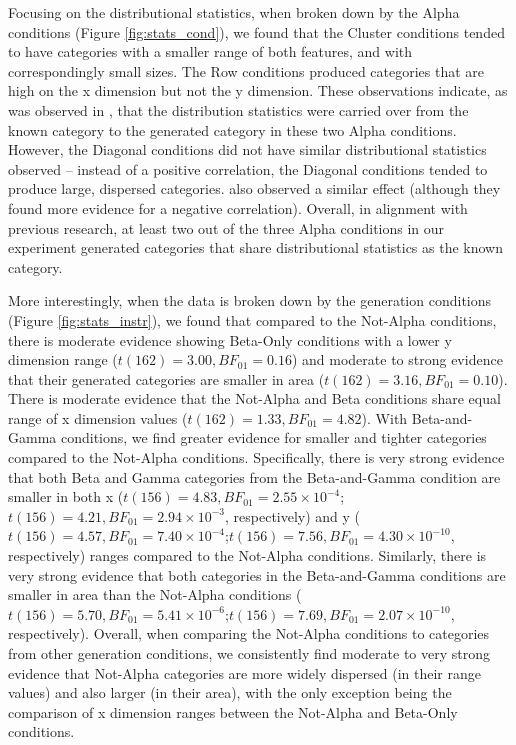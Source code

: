 \documentclass[10pt,letterpaper]{article}
\begin{document}
Focusing on the distributional statistics, when broken down by the Alpha conditions (Figure \ref{fig:stats_cond}), we found that the Cluster conditions tended to have categories with a smaller range of both features, and with correspondingly small sizes. The Row conditions produced categories that are high on the x dimension but not the y dimension. These observations indicate, as was observed in , that the distribution statistics were carried over from the known category to the generated category in these two Alpha conditions. However, the Diagonal conditions did not have similar distributional statistics observed -- instead of a positive correlation, the Diagonal conditions tended to produce large, dispersed categories.  also observed a similar effect (although they found more evidence for a negative correlation). Overall, in alignment with previous research, at least two out of the three Alpha conditions in our experiment generated categories that share distributional statistics as the known category.

More interestingly, when the data is broken down by the generation conditions (Figure \ref{fig:stats_instr}), we found that compared to the Not-Alpha conditions, there is moderate evidence showing Beta-Only conditions with a lower y dimension range ($t(162) = 3.00, BF_{01} = 0.16$) and moderate to strong evidence that their generated categories are smaller in area ($t(162) = 3.16, BF_{01} = 0.10$). There is moderate evidence that the Not-Alpha and Beta conditions share equal range of x dimension values ($t(162) = 1.33, BF_{01} = 4.82$). With Beta-and-Gamma conditions, we find greater evidence for smaller and tighter categories compared to the Not-Alpha conditions. Specifically, there is very strong evidence that both Beta and Gamma categories from the Beta-and-Gamma condition are smaller in both x ($t(156) = 4.83, BF_{01} = 2.55 \times 10^{-4}$;$t(156) = 4.21, BF_{01} = 2.94 \times 10^{-3}$, respectively) and y ($t(156) = 4.57, BF_{01} = 7.40 \times 10^{-4}$;$t(156) = 7.56, BF_{01} = 4.30 \times 10^{-10}$, respectively) ranges compared to the Not-Alpha conditions. Similarly, there is very strong evidence that both categories in the Beta-and-Gamma conditions are smaller in area than the Not-Alpha conditions ($t(156) = 5.70, BF_{01} = 5.41 \times 10^{-6}$;$t(156) = 7.69, BF_{01} = 2.07 \times 10^{-10}$, respectively). Overall, when comparing the Not-Alpha conditions to categories from other generation conditions, we consistently find moderate to very strong evidence that Not-Alpha categories are more widely dispersed (in their range values) and also larger (in their area), with the only exception being the comparison of x dimension ranges between the Not-Alpha and Beta-Only conditions.
\end{document}
